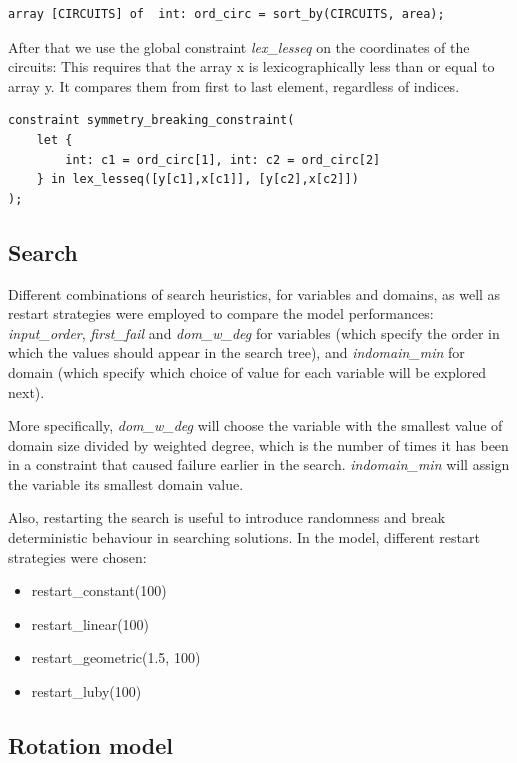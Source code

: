 \begin{verbatim}
array [CIRCUITS] of  int: ord_circ = sort_by(CIRCUITS, area);
\end{verbatim}

After that we use the global constraint \textit{lex\_lesseq} on the coordinates of the circuits: This requires that the array x is lexicographically less than or equal to array y. It compares them from first to last element, regardless of indices.

\begin{verbatim}
constraint symmetry_breaking_constraint(
    let {
        int: c1 = ord_circ[1], int: c2 = ord_circ[2]
    } in lex_lesseq([y[c1],x[c1]], [y[c2],x[c2]])
);
\end{verbatim}

\subsection{Search}

Different combinations of search heuristics, for variables and domains, as well as restart strategies were employed to compare the model performances: \textit{input\_order}, \textit{first\_fail} and \textit{dom\_w\_deg} for variables (which specify the order in which the values should appear in the search tree), and \textit{indomain\_min} for domain (which specify which choice of value for each variable will be explored next).

More specifically, \textit{dom\_w\_deg} will choose the variable with the smallest value of domain size divided by weighted degree, which is the number of times it has been in a
constraint that caused failure earlier in the search. \textit{indomain\_min} will assign the variable its smallest domain value.

Also, restarting the search is useful to introduce randomness and break deterministic behaviour in searching solutions. In the model, different restart strategies were chosen:
\begin{itemize}
    \item restart\_constant(100)
    \item restart\_linear(100)
    \item restart\_geometric(1.5, 100)
    \item restart\_luby(100)
\end{itemize}

\subsection{Rotation model}

